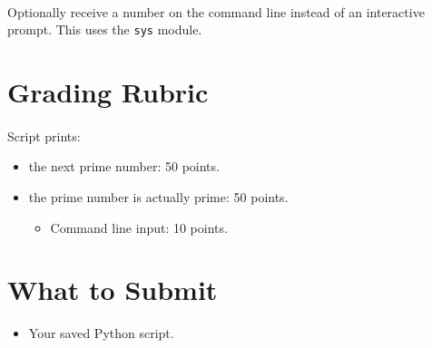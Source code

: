 \documentclass[letter,10pt]{article}
\begin{document}
    \paragraph{}Optionally receive a number on the command line instead of an interactive prompt. This uses the \texttt{sys} module.

    \section*{Grading Rubric}
    \paragraph{}Script prints:
    \begin{itemize}
        \item the next prime number: 50 points.
        \item the prime number is actually prime: 50 points.
        \begin{itemize}
            \item Command line input: 10 points.
        \end{itemize}
    \end{itemize}
    
    \section*{What to Submit}
    \begin{itemize}
        \item Your saved Python script.
    \end{itemize}
    
\end{document}
